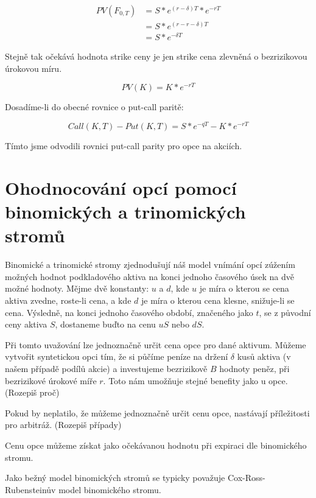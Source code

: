 \documentclass[male,czech,api_bc]{kitheses}
\begin{document}
  \begin{align}
    PV(F_{0, T}) &= S * e^{(r - \delta) T} * e^{-rT} \\
                 &= S * e^{(r - r - \delta) T} \\
                 &= S * e^{- \delta T}
  \end{align}

  Stejně tak očekává hodnota strike ceny je jen strike cena zlevněná o bezrizikovou úrokovou míru.

  \begin{equation}
    PV(K) = K * e^{- rT}
  \end{equation}

  Dosadíme-li do obecné rovnice o put-call paritě:

  \begin{equation}
     Call(K, T) - Put(K, T) = S * e^{-qT} - K * e^{-rT} 
  \end{equation}

  Tímto jsme odvodili rovnici put-call parity pro opce na akciích.

  \section{Ohodnocování opcí pomocí binomických a trinomických stromů}

    Binomické a trinomické stromy zjednodušují náš model vnímání opcí zúžením možných hodnot podkladového aktiva na konci jednoho časového úsek na dvě možné hodnoty. Mějme dvě konstanty: $u$ a $d$, kde $u$ je míra o kterou se cena aktiva zvedne, roste-li cena, a kde $d$ je míra o kterou cena klesne, snižuje-li se cena. Výsledně, na konci jednoho časového období, značeného jako $t$, se z původní ceny aktiva $S$, dostaneme buďto na cenu $uS$ nebo $dS$.

  Při tomto uvažování lze jednoznačně určit cena opce pro dané aktivum. Můžeme vytvořit syntetickou opci tím, že si půčíme peníze na držení $\delta$ kusů aktiva (v našem případě podílů akcie) a investujeme bezrizikově $B$ hodnoty peněz, při bezrizikové úrokové míře $r$. Toto nám umožňuje stejné benefity jako u opce. (Rozepiš proč)

  Pokud by neplatilo, že můžeme jednoznačně určit cenu opce, nastávají příležitosti pro arbitráž. (Rozepiš případy)

  Cenu opce můžeme získat jako očekávanou hodnotu při expiraci dle binomického stromu.

  Jako bežný model binomických stromů se typicky považuje Cox-Ross-Rubensteinův model binomického stromu.
\end{document}

